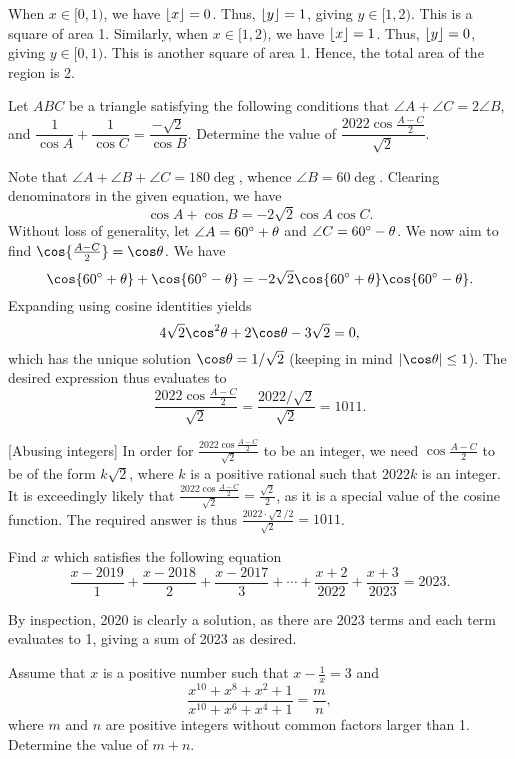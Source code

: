 When $x \in [0, 1)$, we have $\left\lfloor x \right\rfloor = 0$. Thus, $\left\lfloor y \right\rfloor = 1$, giving $y \in [1, 2)$. This is a square of area 1. Similarly, when $x \in [1, 2)$, we have $\left\lfloor x \right\rfloor = 1$. Thus, $\left\lfloor y \right\rfloor = 0$, giving $y \in [0, 1)$. This is another square of area 1. Hence, the total area of the region is 2.

\begin{question}[1011]\label{A::2023-O-1-11}
    Let $ABC$ be a triangle satisfying the following conditions that $\angle A + \angle C = 2\angle B$, and $\dfrac1{\cos A} + \dfrac1{\cos C} = \dfrac{-\sqrt2}{\cos B}$. Determine the value of $\dfrac{2022\cos{\frac{A-C}{2}}}{\sqrt2}$.
\end{question}

 Note that $\angle A + \angle B + \angle C = 180 \deg$, whence $\angle B = 60 \deg$. Clearing denominators in the given equation, we have \[\cos A + \cos B = -2\sqrt{2}\cos A \cos C. \] Without loss of generality, let $\angle A = 60^{\circ} + \theta$ and $\angle C = 60 ^{\circ} - \theta$. We now aim to find $\cos{\frac{A-C}{2}} = \cos\t$. We have \[\cos{60\deg + \t} + \cos{60\deg - \t} = -2\sqrt2 \cos{60\deg + \t}\cos{60 \deg - \t}.\] Expanding using cosine identities yields \[4\sqrt2 \cos^2 \t + 2\cos \t - 3\sqrt2 = 0,\] which has the unique solution $\cos \t = 1/\sqrt2$ (keeping in mind $\abs{\cos \t} \leq 1$). The desired expression thus evaluates to \[\frac{2022\cos{\tfrac{A-C}{2}}}{\sqrt2} = \frac{2022/\sqrt{2}}{\sqrt2} = 1011.\]

[Abusing integers] In order for $\frac{2022\cos{\frac{A-C}{2}}}{\sqrt2}$ to be an integer, we need $\cos{\frac{A-C}{2}}$ to be of the form $k\sqrt{2}$, where $k$ is a positive rational such that $2022k$ is an integer. It is exceedingly likely that $\frac{2022\cos{\frac{A-C}{2}}}{\sqrt2} = \frac{\sqrt2}{2}$, as it is a special value of the cosine function. The required answer is thus $\frac{2022\cdot\sqrt{2}/2}{\sqrt2} = 1011$.

\begin{question}[2020]\label{A::2023-O-1-12}
    Find $x$ which satisfies the following equation \[\dfrac{x-2019}{1} + \dfrac{x-2018}{2} + \dfrac{x-2017}{3} + \cdots + \dfrac{x+2}{2022} + \dfrac{x+3}{2023} = 2023.\]
\end{question}

By inspection, 2020 is clearly a solution, as there are 2023 terms and each term evaluates to 1, giving a sum of 2023 as desired.

\begin{question}[229]\label{A::2023-O-1-13}
    Assume that $x$ is a positive number such that $x - \frac1x = 3$ and \[\dfrac{x^{10} + x^8 + x^2 + 1}{x^{10} + x^6 + x^4 + 1} = \dfrac{m}{n},\] where $m$ and $n$ are positive integers without common factors larger than 1. Determine the value of $m + n$.
\end{question}

